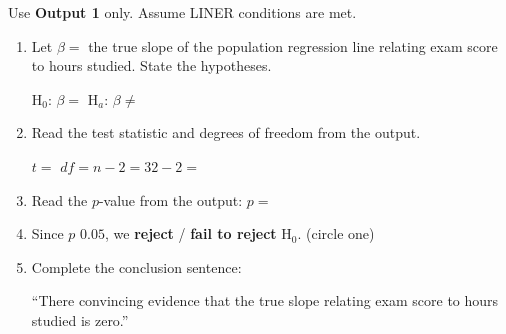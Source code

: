 \documentclass[10pt]{article}
\begin{document}
\begin{tcolorbox}[colback=white, colframe=black!40,
    title=\textbf{Tier R --- Remediate},
    fonttitle=\bfseries, arc=2mm, left=3mm, right=3mm, top=2mm, bottom=2mm]

Use \textbf{Output 1} only. Assume LINER conditions are met.

\begin{enumerate}[label=\alph*.]

  \item Let $\beta =$ the true slope of the population regression line relating exam score
        to hours studied. State the hypotheses.

        H$_0$: $\beta = $ \blank{2cm} \qquad H$_a$: $\beta \ne $ \blank{2cm}

  \item Read the test statistic and degrees of freedom from the output.

        $t = $ \blank{2cm} \qquad $df = n - 2 = 32 - 2 = $ \blank{2cm}

  \item Read the $p$-value from the output: $p = $ \blank{2cm}

  \item Since $p$ \blank{1cm} $0.05$, we \quad \textbf{reject} \quad/\quad
        \textbf{fail to reject} \quad H$_0$.  \hfill(circle one)

  \item Complete the conclusion sentence:

        ``There \blank{2cm} convincing evidence that the true slope relating exam score
        to hours studied is \blank{2cm} zero.''

\end{enumerate}
\end{tcolorbox}
\end{document}
